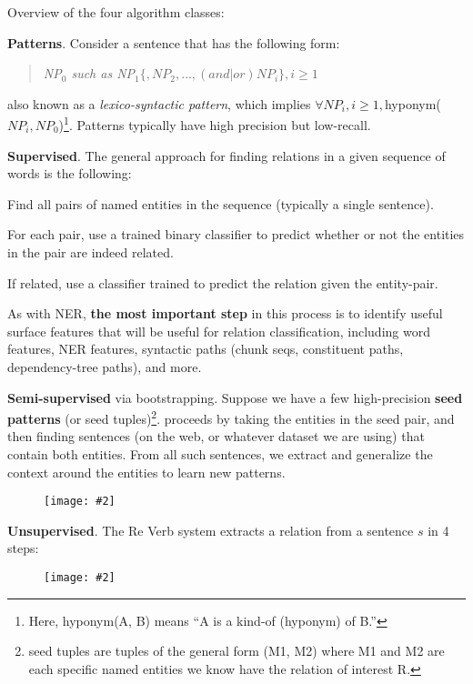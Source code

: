\documentclass[11pt]{article}
\newcommand\myfig[2][0.3\textwidth]{\begin{figure}[h!]\centering\texttt{[image: \#2]}\end{figure}}
\newcommand\p{\Needspace{10\baselineskip} \noindent}
\begin{document}
\p Overview of the four algorithm classes:
\begin{compactenum}
	\item \textbf{Patterns}. Consider a sentence that has the following form:
	\begin{quote}
		{\small \textit{NP$_0$ such as NP$_1$$\{,NP_2, \ldots, (and|or)NP_i\},i\ge 1$
				}}
	\end{quote}
	also known as a \textit{lexico-syntactic pattern}, which implies $\forall NP_i, i \ge 1,$hyponym($NP_i, NP_0$)\footnote{Here, hyponym(A, B) means ``A is a kind-of (hyponym) of B.''}. Patterns typically have high precision but low-recall. 
	
	\item \textbf{Supervised}. The general approach for finding relations in a given sequence of words is the following:
	\begin{compactenum}
		\item Find all pairs of named entities in the sequence (typically a single sentence). 
		\item For each pair, use a trained binary classifier to predict whether or not the entities in the pair are indeed related. 
		\item If related, use a classifier trained to predict the relation given the entity-pair.
	\end{compactenum}
	As with NER, \textbf{the most important step} in this process is to identify useful surface features that will be useful for relation classification, including word features, NER features, syntactic paths (chunk seqs, constituent paths, dependency-tree paths), and more.
	
	\item \textbf{Semi-supervised} via bootstrapping. Suppose we have a few high-precision \textbf{seed patterns} (or seed tuples)\footnote{seed tuples are tuples of the general form (M1, M2) where M1 and M2 are each specific named entities we know have the relation of interest R.}.  proceeds by taking the entities in the seed pair, and then finding sentences (on the web, or whatever dataset we are using) that contain both entities. From all such sentences, we extract and generalize the context around the entities to learn new patterns. 
	\myfig[0.7\textwidth]{bootstrap-relations.png}
	
	\item \textbf{Unsupervised}. The Re Verb system extracts a relation from a sentence $s$ in 4 steps:
	\myfig[0.7\textwidth]{re-verb.png}
\end{compactenum}
\end{document}
